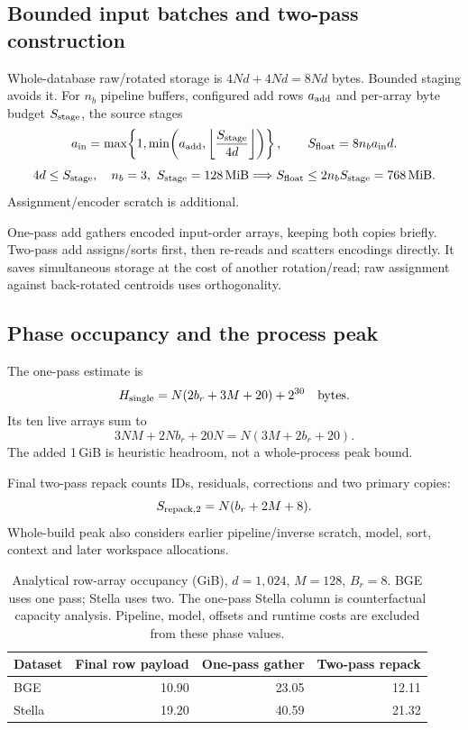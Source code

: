 \subsection{Bounded input batches and two-pass construction}

Whole-database raw/rotated storage is $4Nd+4Nd=8Nd$ bytes. Bounded staging avoids it. For $n_b$ pipeline
buffers, configured add rows $a_{\rm add}$ and per-array byte budget
$S_{\rm stage}$, the source stages
\begin{equation}
 a_{\rm in}=\max\!\left\{1,\min\!\left(a_{\rm add},
 \left\lfloor\frac{S_{\rm stage}}{4d}\right\rfloor\right)\right\},
 \qquad S_{\rm float}=8n_ba_{\rm in}d.
 \label{eq:4-staging-rows}
\end{equation}
\[
 4d\leq S_{\rm stage},\quad n_b=3,\ S_{\rm stage}=128\,\mathrm{MiB}
 \Longrightarrow S_{\rm float}\leq2n_bS_{\rm stage}=768\,\mathrm{MiB}.
\]
Assignment/encoder scratch is additional.

One-pass add gathers encoded input-order arrays, keeping both copies briefly. Two-pass add assigns/sorts first, then re-reads and scatters encodings directly. It saves simultaneous storage at the cost of another rotation/read; raw assignment against back-rotated centroids uses orthogonality.

\subsection{Phase occupancy and the process peak}

The one-pass estimate is
\begin{equation}
 H_{\rm single}=N(2b_r+3M+20)+2^{30}\quad\text{bytes}.
 \label{eq:4-peak-heuristic}
\end{equation}
Its ten live arrays sum to
\[
 3NM+2Nb_r+20N=N(3M+2b_r+20).
\]
The added 1\,GiB is heuristic headroom, not a whole-process peak bound.

Final two-pass repack counts IDs, residuals, corrections and two primary copies:
\begin{equation}
 S_{\rm repack,2}=N(b_r+2M+8).
 \label{eq:4-two-pass-repack}
\end{equation}
 Whole-build peak also considers earlier pipeline/inverse scratch, model, sort, context and later workspace allocations.

\begin{table}[tbp]
\centering
\caption[Analytical row-array occupancy by construction phase]{Analytical row-array occupancy (GiB), $d=1{,}024$, $M=128$,
$B_r=8$. BGE uses one pass; Stella uses two. The one-pass Stella column
is counterfactual capacity analysis. Pipeline, model, offsets and runtime
costs are excluded from these phase values.}
\label{tab:4-phase-storage}
\small
\begin{tabular}{@{}lrrr@{}}
\toprule
Dataset & Final row payload & One-pass gather & Two-pass repack \\
\midrule
BGE & 10.90 & 23.05 & 12.11 \\
Stella & 19.20 & 40.59 & 21.32 \\
\bottomrule
\end{tabular}
\end{table}

